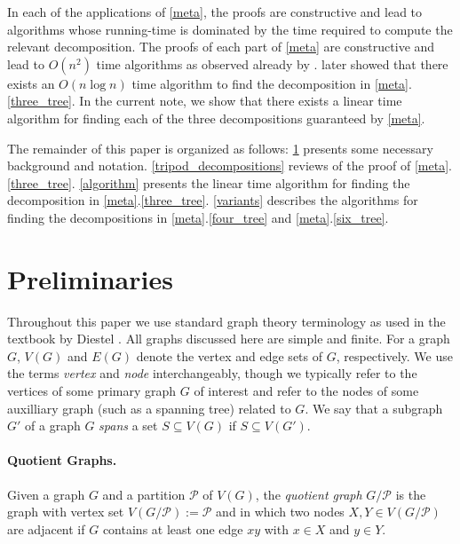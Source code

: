 \documentclass[a4paper,UKenglish,autoref]{lipics-v2021}
\begin{document}
In each of the applications of \cref{meta}, the proofs are constructive and lead to algorithms whose running-time is dominated by the time required to compute the relevant decomposition.  The proofs of each part of \cref{meta} are constructive and lead to $O(n^2)$ time algorithms as observed already by \citet{dujmovic.joret.ea:planar}.  \citet{morin:fast} later showed that there exists an $O(n\log n)$ time algorithm to find the decomposition in \cref{meta}.\ref{three_tree}.  In the current note, we show that there exists a linear time algorithm for finding each of the three decompositions guaranteed by \cref{meta}.

The remainder of this paper is organized as follows: \cref{prelims} presents some necessary background and notation.  \cref{tripod_decompositions} reviews of the proof of \cref{meta}.\ref{three_tree}.  \cref{algorithm} presents the linear time algorithm for finding the decomposition in \cref{meta}.\ref{three_tree}.  \cref{variants} describes the algorithms for finding the decompositions in \cref{meta}.\ref{four_tree} and \cref{meta}.\ref{six_tree}.

\section{Preliminaries}
\label{prelims}

Throughout this paper we use standard graph theory terminology as used in the textbook by Diestel \cite{diestel:graph}.  All graphs discussed here are simple and finite.  For a graph $G$, $V(G)$ and $E(G)$ denote the vertex and edge sets of $G$, respectively.  We use the terms \emph{vertex} and \emph{node} interchangeably, though we typically refer to the vertices of some primary graph $G$ of interest and refer to the nodes of some auxilliary graph (such as a spanning tree) related to $G$.  We say that a subgraph $G'$ of a graph $G$ \emph{spans} a set $S\subseteq V(G)$ if $S\subseteq V(G')$.


\paragraph{Quotient Graphs.}

Given a graph $G$ and a partition $\mathcal{P}$ of $V(G)$, the \emph{quotient graph} $G/\mathcal{P}$ is the graph with vertex set $V(G/\mathcal{P}):=\mathcal{P}$ and in which two nodes $X,Y\in V(G/\mathcal{P})$ are adjacent if $G$ contains at least one edge $xy$ with $x\in X$ and $y\in Y$.
\end{document}
